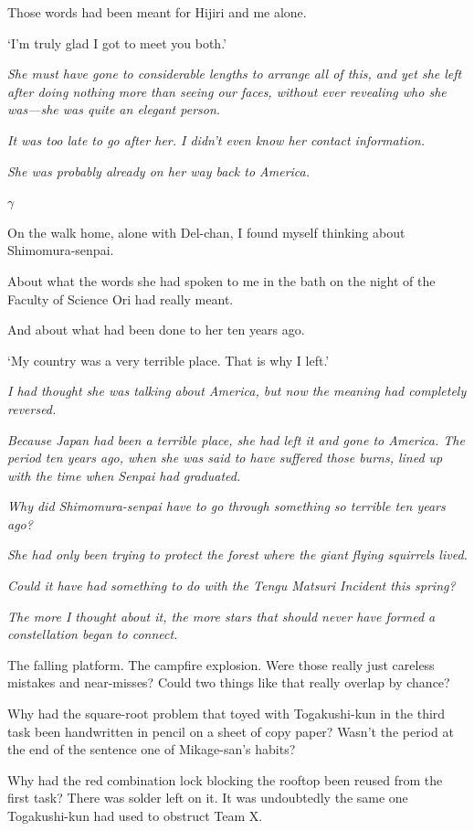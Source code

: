 \documentclass[
    a4paper,
    12pt,
    twoside,
    openany,
    UTF8,
    fontset=windows
]{ctexbook}
\begin{document}
Those words had been meant for Hijiri and me alone.

`I'm truly glad I got to meet you both.'

\textit{She must have gone to considerable lengths to arrange all of this, and yet she left after doing nothing more than seeing our faces, without ever revealing who she was---she was quite an elegant person.}

\textit{It was too late to go after her. I didn't even know her contact information.}

\textit{She was probably already on her way back to America.}

$\gamma$

On the walk home, alone with Del-chan, I found myself thinking about Shimomura-senpai.

About what the words she had spoken to me in the bath on the night of the Faculty of Science Ori had really meant.

And about what had been done to her ten years ago.

`My country was a very terrible place. That is why I left.'

\textit{I had thought she was talking about America, but now the meaning had completely reversed.}

\textit{Because Japan had been a terrible place, she had left it and gone to America. The period ten years ago, when she was said to have suffered those burns, lined up with the time when Senpai had graduated.}

\textit{Why did Shimomura-senpai have to go through something so terrible ten years ago?}

\textit{She had only been trying to protect the forest where the giant flying squirrels lived.}

\textit{Could it have had something to do with the Tengu Matsuri Incident this spring?}

\textit{The more I thought about it, the more stars that should never have formed a constellation began to connect.}

The falling platform. The campfire explosion. Were those really just careless mistakes and near-misses? Could two things like that really overlap by chance?

Why had the square-root problem that toyed with Togakushi-kun in the third task been handwritten in pencil on a sheet of copy paper? Wasn't the period at the end of the sentence one of Mikage-san's habits?

Why had the red combination lock blocking the rooftop been reused from the first task? There was solder left on it. It was undoubtedly the same one Togakushi-kun had used to obstruct Team X.
\end{document}
